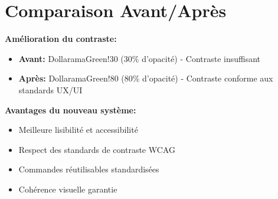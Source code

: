 \documentclass{article}
\begin{document}
\section{Comparaison Avant/Après}

\textbf{Amélioration du contraste:}
\begin{itemize}
\item \textbf{Avant:} DollaramaGreen!30 (30\% d'opacité) - Contraste insuffisant
\item \textbf{Après:} DollaramaGreen!80 (80\% d'opacité) - Contraste conforme aux standards UX/UI
\end{itemize}

\textbf{Avantages du nouveau système:}
\begin{itemize}
\item Meilleure lisibilité et accessibilité
\item Respect des standards de contraste WCAG
\item Commandes réutilisables standardisées
\item Cohérence visuelle garantie
\end{itemize}
\end{document}
